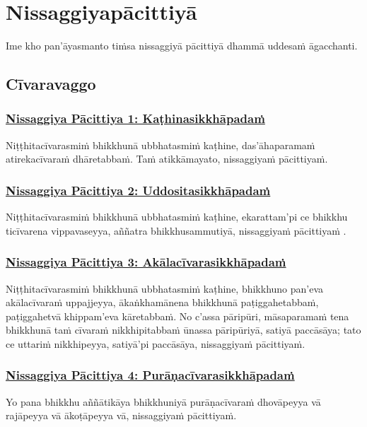 \section{Nissaggiyapācittiyā}
\label{np}

\begin{intro}
  Ime kho pan'āyasmanto tiṁsa nissaggiyā pācittiyā dhammā uddesaṁ āgacchanti.
\end{intro}

\setsubsecheadstyle{\subsectionFmt}
\subsection{Cīvaravaggo}
\vspace{0.2cm}

\subsubsection*{\hyperref[forf-exp1]{Nissaggiya Pācittiya 1: Kaṭhinasikkhāpadaṁ}}
\label{np1}
Niṭṭhitacīvarasmiṁ bhikkhunā ubbhatasmiṁ kaṭhine, das'āhaparamaṁ atirekacīvaraṁ dhāretabbaṁ. Taṁ atikkāmayato, nissaggiyaṁ pācittiyaṁ.

\subsubsection*{\hyperref[forf-exp2]{Nissaggiya Pācittiya 2: Uddositasikkhāpadaṁ}}
\label{np2}
Niṭṭhitacīvarasmiṁ bhikkhunā ubbhatasmiṁ kaṭhine, ekarattam'pi ce bhikkhu ticīvarena vippavaseyya, aññatra bhikkhusammutiyā, nissaggiyaṁ pācittiyaṁ .

\subsubsection*{\hyperref[forf-exp3]{Nissaggiya Pācittiya 3: Akālacīvarasikkhāpadaṁ}}
\label{np3}
Niṭṭhitacīvarasmiṁ bhikkhunā ubbhatasmiṁ kaṭhine, bhikkhuno pan'eva akālacīvaraṁ uppajjeyya, ākaṅkhamānena bhikkhunā paṭiggahetabbaṁ, paṭiggahetvā khippam'eva kāretabbaṁ. No c'assa pāripūri, māsaparamaṁ tena bhikkhunā taṁ cīvaraṁ nikkhipitabbaṁ ūnassa pāripūriyā, satiyā paccāsāya; tato ce uttariṁ nikkhipeyya, satiyā'pi paccāsāya, nissaggiyaṁ pācittiyaṁ.

\subsubsection*{\hyperref[forf-exp4]{Nissaggiya Pācittiya 4: Purāṇacīvarasikkhāpadaṁ}}
\label{np4}
Yo pana bhikkhu aññātikāya bhikkhuniyā purāṇacīvaraṁ dhovāpeyya vā rajāpeyya vā ākoṭāpeyya vā, nissaggiyaṁ pācittiyaṁ.

